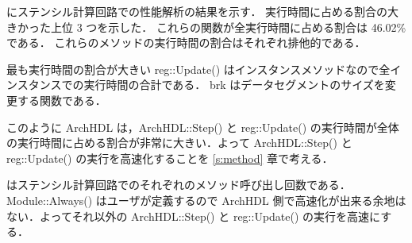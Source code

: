  にステンシル計算回路での性能解析の結果を示す．
実行時間に占める割合の大きかった上位 3 つを示した．
これらの関数が全実行時間に占める割合は 46.02\% である．
これらのメソッドの実行時間の割合はそれぞれ排他的である．

最も実行時間の割合が大きい reg::Update() はインスタンスメソッドなので全インスタンスでの実行時間の合計である．
brk はデータセグメントのサイズを変更する関数である．

このように ArchHDL は，ArchHDL::Step() と reg::Update()
の実行時間が全体の実行時間に占める割合が非常に大きい．よって
ArchHDL::Step() と reg::Update() の実行を高速化することを \ref{s:method}
章で考える．

はステンシル計算回路でのそれぞれのメソッド呼び出し回数である．Module::Always()
はユーザが定義するので ArchHDL
側で高速化が出来る余地はない．よってそれ以外の ArchHDL::Step() と
reg::Update() の実行を高速にする．

\fi